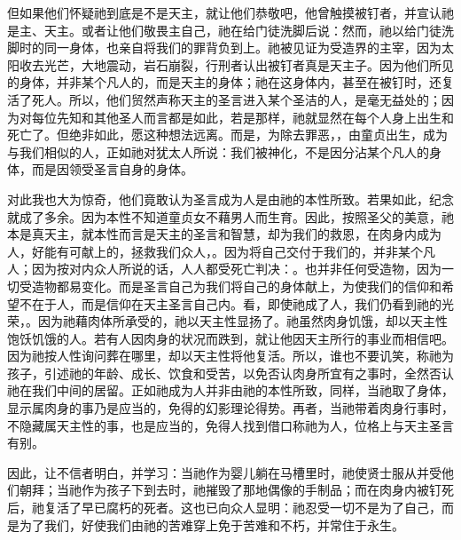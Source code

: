 但如果他们怀疑祂到底是不是天主，就让他们恭敬吧，他曾触摸被钉者，并宣认祂是主、天主。或者让他们敬畏主自己，祂在给门徒洗脚后说：然而，祂以给门徒洗脚时的同一身体，也亲自将我们的罪背负到上。祂被见证为受造界的主宰，因为太阳收去光芒，大地震动，岩石崩裂，行刑者认出被钉者真是天主子。因为他们所见的身体，并非某个凡人的，而是天主的身体；祂在这身体内，甚至在被钉时，还复活了死人。所以，他们贸然声称天主的圣言进入某个圣洁的人，是毫无益处的；因为对每位先知和其他圣人而言都是如此，若是那样，祂就显然在每个人身上出生和死亡了。但绝非如此，愿这种想法远离。而是，为除去罪恶，，由童贞出生，成为与我们相似的人，正如祂对犹太人所说：我们被神化，不是因分沾某个凡人的身体，而是因领受圣言自身的身体。\par

对此我也大为惊奇，他们竟敢认为圣言成为人是由祂的本性所致。若果如此，纪念就成了多余。因为本性不知道童贞女不藉男人而生育。因此，按照圣父的美意，祂本是真天主，就本性而言是天主的圣言和智慧，却为我们的救恩，在肉身内成为人，好能有可献上的，拯救我们众人，。因为将自己交付于我们的，并非某个凡人；因为按对内众人所说的话，人人都受死亡判决：。也并非任何受造物，因为一切受造物都易变化。而是圣言自己为我们将自己的身体献上，为使我们的信仰和希望不在于人，而是信仰在天主圣言自己内。看，即使祂成了人，我们仍看到祂的光荣，。因为祂藉肉体所承受的，祂以天主性显扬了。祂虽然肉身饥饿，却以天主性饱饫饥饿的人。若有人因肉身的状况而跌到，就让他因天主所行的事业而相信吧。因为祂按人性询问葬在哪里，却以天主性将他复活。所以，谁也不要讥笑，称祂为孩子，引述祂的年龄、成长、饮食和受苦，以免否认肉身所宜有之事时，全然否认祂在我们中间的居留。正如祂成为人并非由祂的本性所致，同样，当祂取了身体，显示属肉身的事乃是应当的，免得的幻影理论得势。再者，当祂带着肉身行事时，不隐藏属天主性的事，也是应当的，免得人找到借口称祂为人，位格上与天主圣言有别。\par

因此，让不信者明白，并学习：当祂作为婴儿躺在马槽里时，祂使贤士服从并受他们朝拜；当祂作为孩子下到去时，祂摧毁了那地偶像的手制品；而在肉身内被钉死后，祂复活了早已腐朽的死者。这也已向众人显明：祂忍受一切不是为了自己，而是为了我们，好使我们由祂的苦难穿上免于苦难和不朽，并常住于永生。\par

